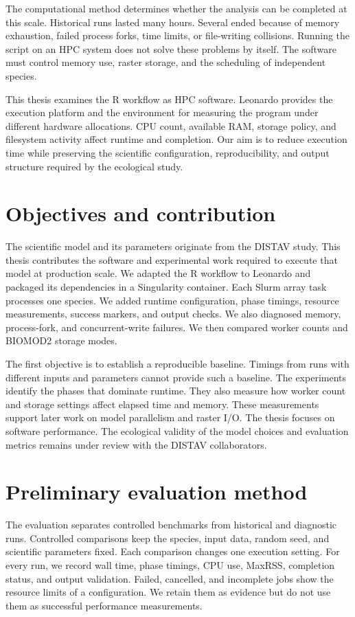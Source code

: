 The computational method determines whether the analysis can be completed at this scale. Historical runs lasted many hours. Several ended because of memory exhaustion, failed process forks, time limits, or file-writing collisions. Running the script on an HPC system does not solve these problems by itself. The software must control memory use, raster storage, and the scheduling of independent species.

This thesis examines the R workflow as HPC software. Leonardo provides the execution platform and the environment for measuring the program under different hardware allocations. CPU count, available RAM, storage policy, and filesystem activity affect runtime and completion. Our aim is to reduce execution time while preserving the scientific configuration, reproducibility, and output structure required by the ecological study.

\section{Objectives and contribution}

The scientific model and its parameters originate from the DISTAV study. This thesis contributes the software and experimental work required to execute that model at production scale. We adapted the R workflow to Leonardo and packaged its dependencies in a Singularity container. Each Slurm array task processes one species. We added runtime configuration, phase timings, resource measurements, success markers, and output checks. We also diagnosed memory, process-fork, and concurrent-write failures. We then compared worker counts and BIOMOD2 storage modes.

The first objective is to establish a reproducible baseline. Timings from runs with different inputs and parameters cannot provide such a baseline. The experiments identify the phases that dominate runtime. They also measure how worker count and storage settings affect elapsed time and memory. These measurements support later work on model parallelism and raster I/O. The thesis focuses on software performance. The ecological validity of the model choices and evaluation metrics remains under review with the DISTAV collaborators.

\section{Preliminary evaluation method}

The evaluation separates controlled benchmarks from historical and diagnostic runs. Controlled comparisons keep the species, input data, random seed, and scientific parameters fixed. Each comparison changes one execution setting. For every run, we record wall time, phase timings, CPU use, MaxRSS, completion status, and output validation. Failed, cancelled, and incomplete jobs show the resource limits of a configuration. We retain them as evidence but do not use them as successful performance measurements.

